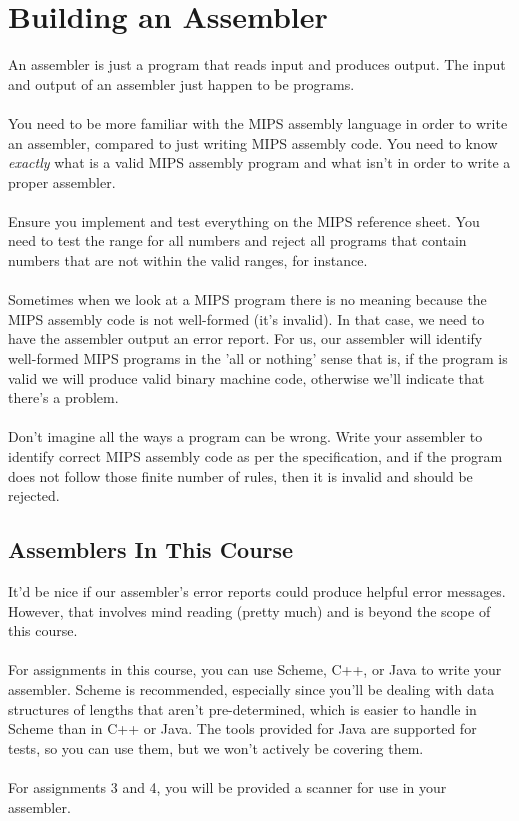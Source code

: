 \documentclass[]{article}
\theoremstyle{definition}
\newcommand{\lecture}[1]{\marginpar{{\footnotesize $\leftarrow$ \underline{#1}}}}
\begin{document}
	\section{Building an Assembler} \lecture{January 21, 2013}
		An assembler is just a program that reads input and produces output. The input and output of an assembler just happen to be programs.
		\\ \\
		You need to be more familiar with the MIPS assembly language in order to write an assembler, compared to just writing MIPS assembly code. You need to know \emph{exactly} what is a valid MIPS assembly program and what isn't in order to write a proper assembler.
		\\ \\
		Ensure you implement and test everything on the MIPS reference sheet. You need to test the range for all numbers and reject all programs that contain numbers that are not within the valid ranges, for instance.
		\\ \\
		Sometimes when we look at a MIPS program there is no meaning because the MIPS assembly code is not well-formed (it's invalid). In that case, we need to have the assembler output an error report. For us, our assembler will identify well-formed MIPS programs in the 'all or nothing' sense \textendash{} that is, if the program is valid we will produce valid binary machine code, otherwise we'll indicate that there's a problem.
		\\ \\
		Don't imagine all the ways a program can be wrong. Write your assembler to identify correct MIPS assembly code as per the specification, and if the program does not follow those finite number of rules, then it is invalid and should be rejected.
		
		\subsection{Assemblers In This Course}
			It'd be nice if our assembler's error reports could produce helpful error messages. However, that involves mind reading (pretty much) and is beyond the scope of this course.
			\\ \\
			For assignments in this course, you can use Scheme, C++, or Java to write your assembler. Scheme is recommended, especially since you'll be dealing with data structures of lengths that aren't pre-determined, which is easier to handle in Scheme than in C++ or Java. The tools provided for Java are supported for tests, so you can use them, but we won't actively be covering them.
			\\ \\
			For assignments 3 and 4, you will be provided a scanner for use in your assembler.
\end{document}
